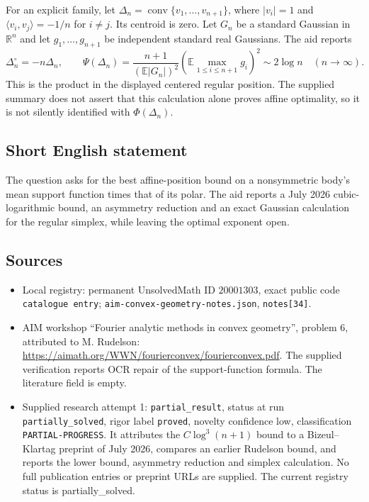\documentclass[11pt]{article}
\newcommand{\R}{\mathbb{R}}
\newcommand{\E}{\mathbb{E}}
\begin{document}
For an explicit family, let \(\Delta_n=\operatorname{conv}\{v_1,\ldots,v_{n+1}\}\), where \(|v_i|=1\) and \(\langle v_i,v_j\rangle=-1/n\) for \(i\ne j\). Its centroid is zero. Let \(G_n\) be a standard Gaussian in \(\R^n\) and let \(g_1,\ldots,g_{n+1}\) be independent standard real Gaussians. The aid reports
\[
 \Delta_n^\circ=-n\Delta_n,\qquad
 \Psi(\Delta_n)=
 \frac{n+1}{(\E|G_n|)^2}
 \left(\E\max_{1\leq i\leq n+1}g_i\right)^2
 \sim2\log n\quad(n\to\infty).
\]
This is the product in the displayed centered regular position. The supplied summary does not assert that this calculation alone proves affine optimality, so it is not silently identified with \(\Phi(\Delta_n)\).
\subsection{Short English statement}
The question asks for the best affine-position bound on a nonsymmetric body's mean support function times that of its polar. The aid reports a July 2026 cubic-logarithmic bound, an asymmetry reduction and an exact Gaussian calculation for the regular simplex, while leaving the optimal exponent open.
\subsection{Sources}
\begin{itemize}
\item Local registry: permanent UnsolvedMath ID \(20001303\), exact public code \texttt{catalogue entry}; \texttt{aim-convex-geometry-notes.json}, \texttt{notes[34]}.
\item AIM workshop ``Fourier analytic methods in convex geometry'', problem 6, attributed to M. Rudelson: \url{https://aimath.org/WWN/fourierconvex/fourierconvex.pdf}. The supplied verification reports OCR repair of the support-function formula. The literature field is empty.
\item Supplied research attempt 1: \texttt{partial\_result}, status at run \texttt{partially\_solved}, rigor label \texttt{proved}, novelty confidence low, classification \texttt{PARTIAL-PROGRESS}. It attributes the \(C\log^3(n+1)\) bound to a Bizeul--Klartag preprint of July 2026, compares an earlier Rudelson bound, and reports the lower bound, asymmetry reduction and simplex calculation. No full publication entries or preprint URLs are supplied. The current registry status is partially_solved.
\end{itemize}
\end{document}

